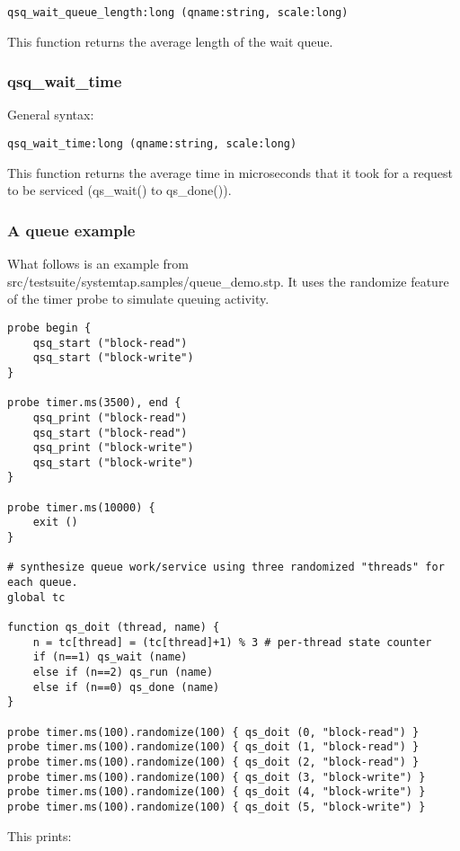 \documentclass[twoside,english]{article}
\newenvironment{vindent}
{\begin{list}{}{\setlength{\listparindent}{6pt}}
\item[]}
{\end{list}}
\begin{document}
\begin{vindent}
\begin{verbatim}
qsq_wait_queue_length:long (qname:string, scale:long)
\end{verbatim}
\end{vindent}
This function returns the average length of the wait queue.


\subsubsection{qsq\_wait\_time}
General syntax:

\begin{vindent}
\begin{verbatim}
qsq_wait_time:long (qname:string, scale:long)
\end{verbatim}
\end{vindent}
This function returns the average time in microseconds that it took for a
request to be serviced (qs\_wait() to qs\_done()).


\subsubsection{A queue example}

What follows is an example from src/testsuite/systemtap.samples/queue\_demo.stp.
It uses the randomize feature of the timer probe to simulate queuing activity.

\begin{vindent}
\begin{verbatim}
probe begin {
    qsq_start ("block-read")
    qsq_start ("block-write")
}

probe timer.ms(3500), end {
    qsq_print ("block-read")
    qsq_start ("block-read")
    qsq_print ("block-write")
    qsq_start ("block-write")
}

probe timer.ms(10000) {
    exit ()
}

# synthesize queue work/service using three randomized "threads" for each queue.
global tc

function qs_doit (thread, name) {
    n = tc[thread] = (tc[thread]+1) % 3 # per-thread state counter
    if (n==1) qs_wait (name)
    else if (n==2) qs_run (name)
    else if (n==0) qs_done (name)
}

probe timer.ms(100).randomize(100) { qs_doit (0, "block-read") }
probe timer.ms(100).randomize(100) { qs_doit (1, "block-read") }
probe timer.ms(100).randomize(100) { qs_doit (2, "block-read") }
probe timer.ms(100).randomize(100) { qs_doit (3, "block-write") }
probe timer.ms(100).randomize(100) { qs_doit (4, "block-write") }
probe timer.ms(100).randomize(100) { qs_doit (5, "block-write") }
\end{verbatim}
\end{vindent}
This prints:
\end{document}
